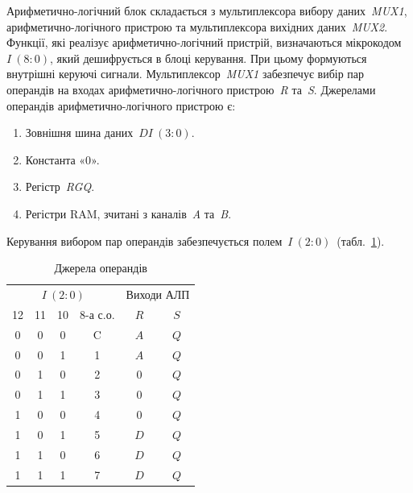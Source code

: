 \documentclass[a4paper,oneside,DIV=12,12pt,headings=normal]{scrartcl}
\newcommand{\allcaps}[1]{{\addfontfeatures{LetterSpace = 3}#1}}
\newcommand{\schel}[1]{\textit{#1}}
\newcommand{\addrinterval}[2]{(#1{:}#2)}
\begin{document}
				Арифметично-логічний блок складається з мультиплексора вибору даних~\schel{MUX1}, арифметично-логічного пристрою та мультиплексора вихідних даних~\schel{MUX2}. Функції, які реалізує арифметично-логічний пристрій, визначаються мікрокодом~$I~\addrinterval{8}{0}$, який дешифрується в блоці керування. При цьому формуються внутрішні керуючі сигнали. Мультиплексор~\schel{MUX1} забезпечує вибір пар операндів на входах ариф\-ме\-тич\-но-ло\-гіч\-но\-го пристрою~\schel{R} та~\schel{S}. Джерелами операндів арифметично-логічного пристрою є:
				\begin{enumerate}
					\item Зовнішня шина даних~$\schel{DI}~\addrinterval{3}{0}$.
					\item Константа «0».
					\item Регістр~\schel{RGQ}.
					\item Регістри \allcaps{RAM}, зчитані з каналів~\schel{A} та~\schel{B}.
				\end{enumerate}
				Керування вибором пар операндів забезпечується полем~$\schel{I}~\addrinterval{2}{0}$~(табл.~\ref{tab:operand-sources}).
				\begin{table}[!htbp]
					\centering
					\begin{tabular}{*{6}{c}}
						\toprule
							\multicolumn{4}{c}{$\schel{I}~\addrinterval{2}{0}$} & \multicolumn{2}{c}{Виходи АЛП}\\
							\cmidrule(lr){1-4} \cmidrule(lr){5-6}
							12 & 11 & 10 & 8-а с.о. & $R$ & $S$ \\
						\midrule
							0  & 0  & 0  & C        & $A$ & $Q$ \\
							0  & 0  & 1  & 1        & $A$ & $Q$ \\
							0  & 1  & 0  & 2        & $0$ & $Q$ \\
							0  & 1  & 1  & 3        & $0$ & $Q$ \\
							1  & 0  & 0  & 4        & $0$ & $Q$ \\
							1  & 0  & 1  & 5        & $D$ & $Q$ \\
							1  & 1  & 0  & 6        & $D$ & $Q$ \\
							1  & 1  & 1  & 7        & $D$ & $Q$ \\
						\bottomrule
					\end{tabular}
					\caption{Джерела операндів}
					\label{tab:operand-sources}
				\end{table}
\end{document}
